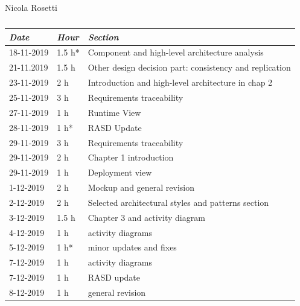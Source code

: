\documentclass[a4paper]{report}
\begin{document}
\begin{table}[H]
\centering
Nicola Rosetti \\
\begin{tabular}{p{2cm}p{1.5cm}p{7cm}}
\toprule
\textit{Date} & \textit{Hour} & \textit{Section} \\ \midrule
18-11-2019 & 1.5 h* & Component and high-level architecture analysis \\ \midrule
21-11.2019 & 1.5 h & Other design decision part: consistency and replication \\ \midrule
23-11-2019 & 2 h & Introduction and high-level architecture in chap 2 \\ \midrule
25-11-2019 & 3 h & Requirements traceability \\ \midrule
27-11-2019 & 1 h & Runtime View \\ \midrule
28-11-2019 & 1 h* & RASD Update \\ \midrule
29-11-2019 & 3 h & Requirements traceability \\ \midrule
29-11-2019 & 2 h & Chapter 1 introduction \\ \midrule
29-11-2019 & 1 h & Deployment view \\ \midrule
1-12-2019 & 2 h & Mockup and general revision \\ \midrule
2-12-2019 & 2 h & Selected architectural styles and patterns section \\ \midrule
3-12-2019 & 1.5 h & Chapter 3 and activity diagram \\ \midrule
4-12-2019 & 1 h & activity diagrams \\ \midrule
5-12-2019 & 1 h* & minor updates and fixes\\ \midrule
7-12-2019 & 1 h & activity diagrams \\ \midrule
7-12-2019 & 1 h & RASD update\\ \midrule
8-12-2019 & 1 h & general revision\\
\bottomrule
\end{tabular}
\caption[Nicola Rosetti's effort table]{}
\end{table}
\end{document}
